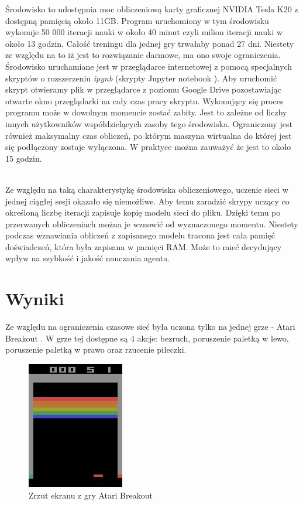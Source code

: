 \documentclass[12pt]{article}
\begin{document}
Środowisko to udostępnia moc obliczeniową karty graficznej NVIDIA Tesla K20 z dostępną pamięcią około 11GB. Program uruchomiony w tym środowisku wykonuje 50 000 iteracji nauki w około 40 minut czyli milion iteracji nauki w około 13 godzin. Całość treningu dla jednej gry trwałaby ponad 27 dni. Niestety ze względu na to iż jest to rozwiązanie darmowe, ma ono swoje ograniczenia. Środowisko uruchamiane jest w przeglądarce internetowej z pomocą specjalnych skryptów o rozszerzeniu \textit{ipynb} (skrypty Jupyter notebook \cite{jupiter}). Aby uruchomić skrypt otwieramy plik w przeglądarce z poziomu Google Drive \cite{drive} pozostawiając otwarte okno przeglądarki na cały czas pracy skryptu. Wykonujący się proces programu może w dowolnym momencie zostać zabity. Jest to zależne od liczby innych użytkowników współdzielących zasoby tego środowiska. Ograniczony jest również maksymalny czas obliczeń, po którym maszyna wirtualna do której jest się podłączony zostaje wyłączona. W praktyce można zauważyć że jest to około 15 godzin. 
\\\

Ze względu na taką charakterystykę środowiska obliczeniowego, uczenie sieci w jednej ciągłej sesji okazało się niemożliwe. Aby temu zaradzić skrypy uczący co określoną liczbę iteracji zapisuje kopię modelu sieci do pliku. Dzięki temu po przerwanych obliczeniach można je wznowić od wyznaczonego momentu. Niestety podczas wznawiania obliczeń z zapisanego modelu tracona jest cała pamięć doświadczeń, która była zapisana w pamięci RAM. Może to mieć decydujący wpływ na szybkość i jakość nauczania agenta.


\section{Wyniki}
Ze względu na ograniczenia czasowe sieć była uczona tylko na jednej grze - Atari Breakout \cite{breakout}. W grze tej dostępne są 4 akcje: bezruch, poruszenie paletką w lewo, poruszenie paletką w prawo oraz rzucenie piłeczki.

\begin{figure}[H]
\centering \includegraphics[scale=1]{1_raw.jpg}
\caption{Zrzut ekranu z gry Atari Breakout}
\label{atari1}
\end{figure}
\end{document}
